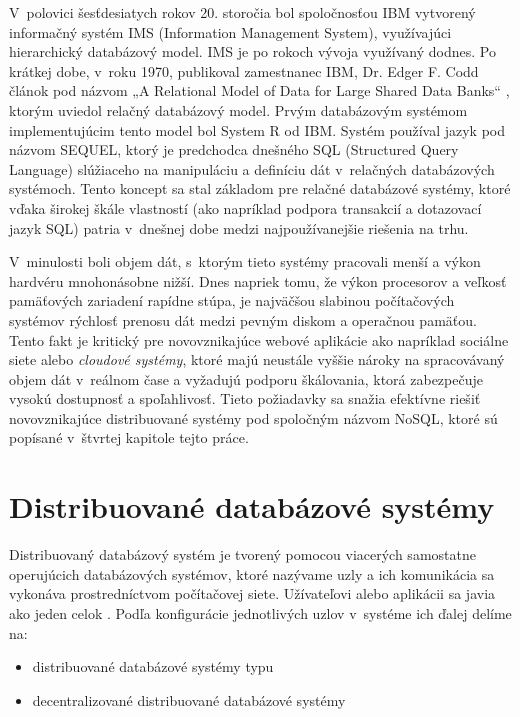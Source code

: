 \documentclass[11pt,twoside,a4paper]{book}
\begin{document}
V~polovici šesťdesiatych rokov 20. storočia bol spoločnosťou IBM vytvorený informačný systém IMS (Information Management System), využívajúci hierarchický databázový model. IMS je po rokoch vývoja využívaný dodnes. Po krátkej dobe, v~roku 1970, publikoval zamestnanec IBM, Dr. Edger F. Codd článok pod názvom „A Relational Model of Data for Large Shared Data Banks“ \cite{Codd:1970:RMD:362384.362685}, ktorým uviedol relačný databázový model. Prvým databázovým systémom implementujúcim tento model bol System R od IBM. Systém používal jazyk pod názvom SEQUEL, ktorý je predchodca dnešného SQL (Structured Query Language) slúžiaceho na manipuláciu a definíciu dát v~relačných databázových systémoch. Tento koncept sa stal základom pre relačné databázové systémy, ktoré vďaka širokej škále vlastností (ako napríklad podpora transakcií a dotazovací jazyk SQL) patria v~dnešnej  dobe medzi najpoužívanejšie riešenia na trhu.

V~minulosti boli objem dát, s~ktorým tieto systémy pracovali menší a výkon hardvéru mnohonásobne nižší. Dnes napriek tomu, že výkon procesorov a veľkosť pamäťových zariadení rapídne stúpa, je najväčšou slabinou počítačových systémov rýchlosť prenosu dát medzi pevným diskom a operačnou pamäťou. Tento fakt je kritický pre novovznikajúce webové aplikácie ako napríklad sociálne siete alebo \emph{cloudové systémy}, ktoré majú neustále vyššie nároky na spracovávaný objem dát v~reálnom čase a vyžadujú podporu škálovania, ktorá zabezpečuje vysokú dostupnosť a spoľahlivosť. Tieto požiadavky sa snažia efektívne riešiť novovznikajúce distribuované systémy pod spoločným názvom NoSQL, ktoré sú popísané v~štvrtej kapitole tejto práce. %


\section{Distribuované databázové systémy}
Distribuovaný databázový systém je tvorený pomocou viacerých samostatne operujúcich databázových systémov, ktoré nazývame uzly a ich komunikácia sa vykonáva prostredníctvom počítačovej siete. Užívateľovi alebo aplikácii sa javia ako jeden celok \cite{hewitt2010cassandra}. Podľa konfigurácie jednotlivých uzlov v~systéme ich ďalej delíme na:
\begin{itemize}
 \item distribuované databázové systémy typu 
 \item decentralizované distribuované databázové systémy
\end{itemize}
\end{document}
